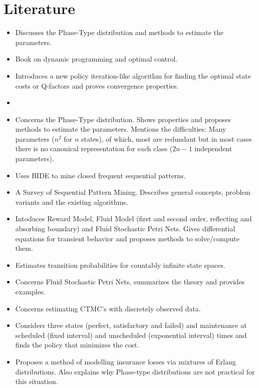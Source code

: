 \section{Literature}
\begin{itemize}
\item \citep{Asmussen1996} Discusses the Phase-Type distribution and methods to estimate the parameters.
\item \citep{Bertsekas1995} Book on dynamic programming and optimal control.
\item \citep{Bertsekas2012} Introduces a new policy iteration-like
algorithm for finding the optimal state costs or Q-factors and proves convergence properties.
\item \citep{Birge2011}
\item \citep{Buchholz2014} Concerns the Phase-Type distribution. Shows properties and proposes methods to estimate the parameters. Mentions the difficulties: Many parameters ($n^2$ for $n$ states), of which, most are redundant but in most cases there is no canonical representation for each class ($2n-1$ independent parameters).
\item \citep{Chen2014} Uses BIDE to mine closed frequent sequential patterns.
\item \citep{Fournier-Viger2017} A Survey of Sequential Pattern Mining. Describes general concepts, problem variants and the existing algorithms.
\item \citep{Gribaudo2007} Intoduces Reward Model, Fluid Model (first and second order, reflecting and absorbing boundary) and Fluid Stochastic Petri Nets. Gives differential equations for transient behavior and proposes methods to solve/compute them.
\item\citep{Hajiaghayi2014} Estimates transition probabilities for countably infinite state spaces.
\item \citep{Horton1998} Concerns Fluid Stochastic Petri Nets, summarizes the theory and provides examples.
\item\citep{Inamura2006} Concerns estimating CTMC's with discretely observed data.
\item \citep{Kalosi2016} Considers three states (perfect, satisfactory and failed) and maintenance at scheduled (fixed interval) and unscheduled (exponential interval) times and finds the policy that minimizes the cost.
\item \citep{Lee2010} Proposes a method of modelling insurance losses via mixtures of Erlang distributions. Also explains why Phase-type distributions are not practical for this situation.

\end{itemize}
